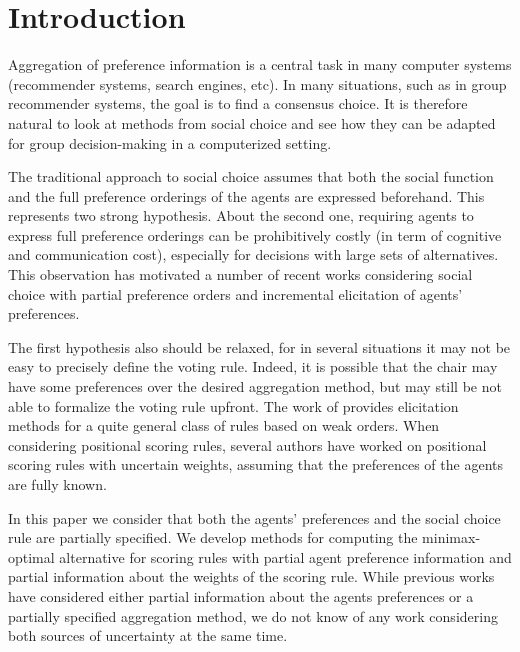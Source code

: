 \section{Introduction}
Aggregation of preference information is a central task in many computer systems (recommender systems, search engines, etc).
In many situations, such as in group recommender systems, the goal is to find a consensus choice.
It is therefore natural to look at methods from social choice and see how they can be adapted for group decision-making in a computerized setting.

The traditional approach to social choice assumes that both the social function and the full preference orderings of the agents are expressed beforehand. This represents two strong hypothesis.
About the second one, requiring agents to express full preference orderings can be prohibitively costly (in term of cognitive and communication cost), especially for decisions with large sets of alternatives.
This observation has motivated a number of recent works considering social choice with partial preference orders \citep{Xia2008, Pini2009, Konczak05} and incremental elicitation \citep{Kalech2011, Lu2011, Naamani-Dery2015} of agents’ preferences. 

The first hypothesis also should be relaxed, for in several situations it may not be easy to precisely define the voting rule.
Indeed, it is possible that the chair may have some preferences over the desired aggregation method, but may still be not able to formalize the voting rule upfront.
The work of \citet{Cailloux2014} provides elicitation methods for a quite general class of rules based on weak orders.
When considering positional scoring rules, several authors \citep{Stein1994, Llamazares2013, Viappiani2018} have worked on positional scoring rules with uncertain weights, assuming that the preferences of the agents are fully known.

In this paper we consider that both the agents’ preferences and the social choice rule are partially specified.
We develop methods for computing the minimax-optimal alternative for scoring rules with partial agent preference information and partial information about the weights of the scoring rule.
While previous works have considered either partial information about the agents preferences or a partially specified aggregation method, we do not know of any work considering both sources of uncertainty at the same time.

